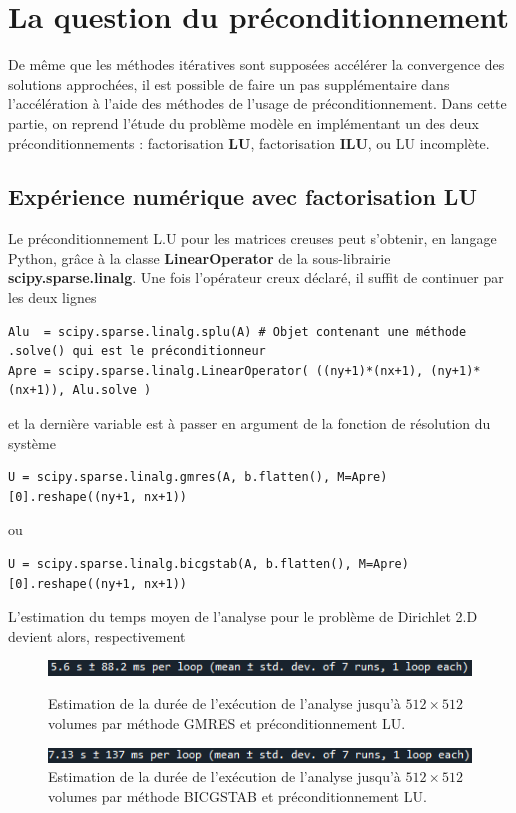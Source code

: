 \section{La question du préconditionnement}

De même que les méthodes itératives sont supposées accélérer la convergence des solutions approchées, il est possible de faire un pas supplémentaire dans l'accélération à l'aide des méthodes de l'usage de préconditionnement. Dans cette partie, on reprend l'étude du problème modèle en implémentant un des deux préconditionnements : factorisation \textbf{LU}, factorisation \textbf{ILU}, ou LU incomplète.

\subsection*{Expérience numérique avec factorisation LU}

Le préconditionnement L.U pour les matrices creuses peut s'obtenir, en langage Python, grâce à la classe \textbf{LinearOperator} de la sous-librairie \textbf{scipy.sparse.linalg}. Une fois l'opérateur creux déclaré, il suffit de continuer par les deux lignes
\begin{verbatim}
Alu  = scipy.sparse.linalg.splu(A) # Objet contenant une méthode .solve() qui est le préconditionneur
Apre = scipy.sparse.linalg.LinearOperator( ((ny+1)*(nx+1), (ny+1)*(nx+1)), Alu.solve )
\end{verbatim}
et la dernière variable est à passer en argument de la fonction de résolution du système
\begin{verbatim}
U = scipy.sparse.linalg.gmres(A, b.flatten(), M=Apre)[0].reshape((ny+1, nx+1))
\end{verbatim}
ou
\begin{verbatim}
U = scipy.sparse.linalg.bicgstab(A, b.flatten(), M=Apre)[0].reshape((ny+1, nx+1))
\end{verbatim}
L'estimation du temps moyen de l'analyse pour le problème de Dirichlet 2.D devient alors, respectivement
\begin{figure}[htp]
\centering
    \includegraphics[width=12cm]{Images/preliminaires/Laplace Dirichlet 2D creux GMRES Precond/tempsLU.png}
    \caption{Estimation de la durée de l'exécution de l'analyse jusqu'à $512 \times 512$ volumes par méthode GMRES et préconditionnement LU.}
    \includegraphics[width=12cm]{Images/preliminaires/Laplace Dirichlet 2D creux BICGSTAB Precond/tempsLU.png}
    \caption{Estimation de la durée de l'exécution de l'analyse jusqu'à $512 \times 512$ volumes par méthode BICGSTAB et préconditionnement LU.}
    \label{fig:preconditionnementLU}
\end{figure}

